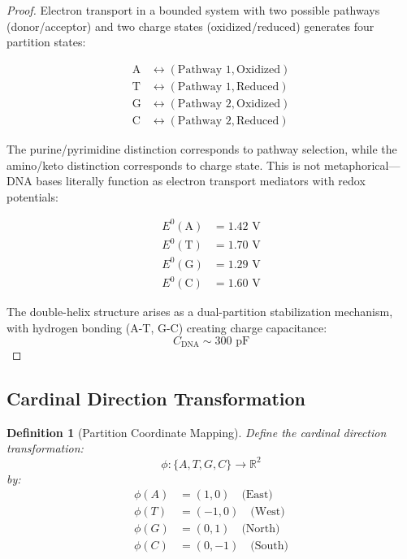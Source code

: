 \documentclass[12pt,a4paper]{article}
\newtheorem{definition}{Definition}
\begin{document}
\begin{proof}
Electron transport in a bounded system with two possible pathways (donor/acceptor) and two charge states (oxidized/reduced) generates four partition states:

\begin{align}
\text{A} &\leftrightarrow (\text{Pathway 1}, \text{Oxidized}) \\
\text{T} &\leftrightarrow (\text{Pathway 1}, \text{Reduced}) \\
\text{G} &\leftrightarrow (\text{Pathway 2}, \text{Oxidized}) \\
\text{C} &\leftrightarrow (\text{Pathway 2}, \text{Reduced})
\end{align}

The purine/pyrimidine distinction corresponds to pathway selection, while the amino/keto distinction corresponds to charge state. This is not metaphorical—DNA bases literally function as electron transport mediators with redox potentials:

\begin{align}
E^0(\text{A}) &= 1.42 \text{ V} \\
E^0(\text{T}) &= 1.70 \text{ V} \\
E^0(\text{G}) &= 1.29 \text{ V} \\
E^0(\text{C}) &= 1.60 \text{ V}
\end{align}

The double-helix structure arises as a dual-partition stabilization mechanism, with hydrogen bonding (A-T, G-C) creating charge capacitance:
$$
C_{\text{DNA}} \sim 300 \text{ pF}
$$
\end{proof}

\subsection{Cardinal Direction Transformation}

\begin{definition}[Partition Coordinate Mapping]
Define the cardinal direction transformation:
$$
\phi: \{A, T, G, C\} \to \mathbb{R}^2
$$
by:
\begin{align}
\phi(A) &= (1, 0) \quad \text{(East)} \\
\phi(T) &= (-1, 0) \quad \text{(West)} \\
\phi(G) &= (0, 1) \quad \text{(North)} \\
\phi(C) &= (0, -1) \quad \text{(South)}
\end{align}
\end{definition}
\end{document}
